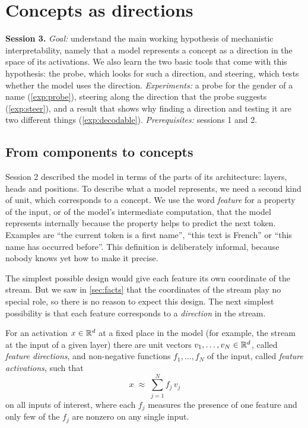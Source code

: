 \section{Concepts as directions}
\label{sec:directions}

\begin{sessioncard}
\textbf{Session 3.} \emph{Goal:} understand the main working hypothesis of mechanistic interpretability, namely
that a model represents a concept as a direction in the space of its activations. We also learn the two basic
tools that come with this hypothesis: the probe, which looks for such a direction, and steering, which tests
whether the model uses the direction.
\emph{Experiments:} a probe for the gender of a name (\cref{exp:probe}), steering along the direction that the
probe suggests (\cref{exp:steer}), and a result that shows why finding a direction and testing it are two
different things (\cref{exp:decodable}).
\emph{Prerequisites:} sessions 1 and 2.
\end{sessioncard}

\subsection{From components to concepts}

Session 2 described the model in terms of the parts of its architecture: layers, heads and positions. To
describe what a model represents, we need a second kind of unit, which corresponds to a concept. We use the word
\emph{feature} for a property of the input, or of the model's intermediate computation, that the model represents
internally because the property helps to predict the next token. Examples are ``the current token is a first
name'', ``this text is French'' or ``this name has occurred before''. This definition is deliberately informal,
because nobody knows yet how to make it precise.

The simplest possible design would give each feature its own coordinate of the stream. But we saw in
\cref{sec:facts} that the coordinates of the stream play no special role, so there is no reason to expect this
design. The next simplest possibility is that each feature corresponds to a \emph{direction} in the stream.

\begin{definition}\label{def:lrh}
For an activation $x\in\mathbb{R}^d$ at a fixed place in the model (for example, the stream at the input of a given layer) there
are unit vectors $v_1,\dots,v_N\in\mathbb{R}^d$, called \emph{feature directions}, and non-negative functions
$f_1,\dots,f_N$ of the input, called \emph{feature activations}, such that
\begin{equation}\label{eq:lrh}
x \;\approx\; \sum_{j=1}^{N}f_j\,v_j
\end{equation}
on all inputs of interest, where each $f_j$ measures the presence of one feature and only few of the $f_j$ are
nonzero on any single input.
\end{definition}

